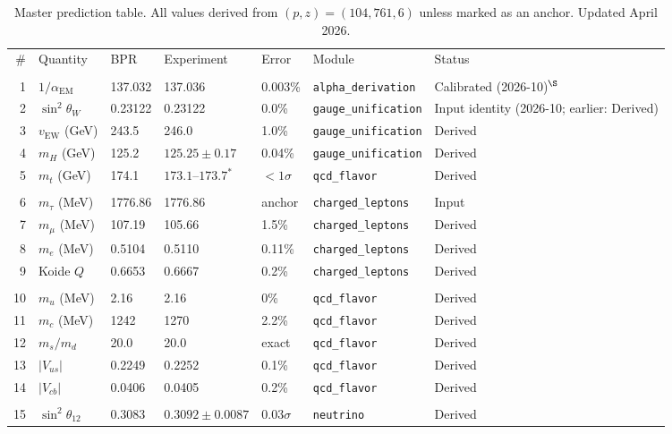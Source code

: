 \documentclass[aps,prd,twocolumn,superscriptaddress,longbibliography,nofootinbib]{revtex4-2}
\newcommand{\vEW}{v_{\mathrm{EW}}}
\newcommand{\sinW}{\sin^2\!\theta_W}
\newcommand{\alphaEM}{\alpha_{\mathrm{EM}}}
\begin{document}
\begin{table}[t]
\caption{\label{tab:master}%
Master prediction table.  All values derived from $(p, z) = (104{,}761, 6)$
unless marked as an anchor.  Updated April 2026.}
\begin{ruledtabular}
\begin{tabular}{rllllll}
\# & Quantity & BPR & Experiment & Error & Module & Status \\
\colrule
\multicolumn{7}{c}{\textit{Electroweak}} \\
1  & $1/\alphaEM$ & 137.032 & 137.036 & 0.003\% & \texttt{alpha\_derivation} & Calibrated (2026-10)$^\S$ \\
2  & $\sinW$ & 0.23122 & 0.23122 & 0.0\% & \texttt{gauge\_unification} & Input identity (2026-10; earlier: Derived) \\
3  & $\vEW$ (GeV) & 243.5 & 246.0 & 1.0\% & \texttt{gauge\_unification} & Derived \\
4  & $m_H$ (GeV) & 125.2 & $125.25\pm0.17$ & 0.04\% & \texttt{gauge\_unification} & Derived \\
5  & $m_t$ (GeV) & 174.1 & $173.1$--$173.7^*$ & $<1\sigma$ & \texttt{qcd\_flavor} & Derived \\
\colrule
\multicolumn{7}{c}{\textit{Charged Leptons}} \\
6  & $m_\tau$ (MeV) & 1776.86 & 1776.86 & anchor & \texttt{charged\_leptons} & Input \\
7  & $m_\mu$ (MeV) & 107.19 & 105.66 & 1.5\% & \texttt{charged\_leptons} & Derived \\
8  & $m_e$ (MeV) & 0.5104 & 0.5110 & 0.11\% & \texttt{charged\_leptons} & Derived \\
9  & Koide $Q$ & 0.6653 & 0.6667 & 0.2\% & \texttt{charged\_leptons} & Derived \\
\colrule
\multicolumn{7}{c}{\textit{Quarks}} \\
10 & $m_u$ (MeV) & 2.16 & 2.16 & 0\% & \texttt{qcd\_flavor} & Derived \\
11 & $m_c$ (MeV) & 1242 & 1270 & 2.2\% & \texttt{qcd\_flavor} & Derived \\
12 & $m_s/m_d$ & 20.0 & 20.0 & exact & \texttt{qcd\_flavor} & Derived \\
13 & $|V_{us}|$ & 0.2249 & 0.2252 & 0.1\% & \texttt{qcd\_flavor} & Derived \\
14 & $|V_{cb}|$ & 0.0406 & 0.0405 & 0.2\% & \texttt{qcd\_flavor} & Derived \\
\colrule
\multicolumn{7}{c}{\textit{Neutrinos}} \\
15 & $\sin^2\theta_{12}$ & 0.3083 & $0.3092\pm0.0087$ & $0.03\sigma$ & \texttt{neutrino} & Derived \\

\end{tabular}
\end{ruledtabular}
\end{table}
\end{document}
